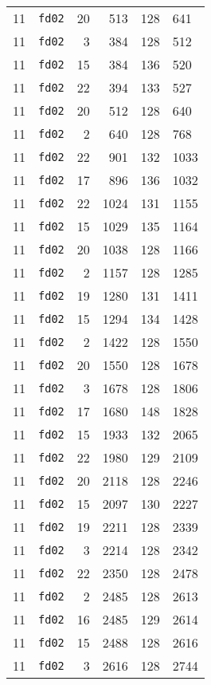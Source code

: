 \documentclass{article}
\begin{document}
\begin{table}[h!]
\begin{tabular}{llrrrl}
    11 & \texttt{fd02} & 20 & 513 & 128 & 641 \\
    11 & \texttt{fd02} & 3 & 384 & 128 & 512 \\
    11 & \texttt{fd02} & 15 & 384 & 136 & 520 \\
    11 & \texttt{fd02} & 22 & 394 & 133 & 527 \\
    11 & \texttt{fd02} & 20 & 512 & 128 & 640 \\
    11 & \texttt{fd02} & 2 & 640 & 128 & 768 \\
    11 & \texttt{fd02} & 22 & 901 & 132 & 1033 \\
    11 & \texttt{fd02} & 17 & 896 & 136 & 1032 \\
    11 & \texttt{fd02} & 22 & 1024 & 131 & 1155 \\
    11 & \texttt{fd02} & 15 & 1029 & 135 & 1164 \\
    11 & \texttt{fd02} & 20 & 1038 & 128 & 1166 \\
    11 & \texttt{fd02} & 2 & 1157 & 128 & 1285 \\
    11 & \texttt{fd02} & 19 & 1280 & 131 & 1411 \\
    11 & \texttt{fd02} & 15 & 1294 & 134 & 1428 \\
    11 & \texttt{fd02} & 2 & 1422 & 128 & 1550 \\
    11 & \texttt{fd02} & 20 & 1550 & 128 & 1678 \\
    11 & \texttt{fd02} & 3 & 1678 & 128 & 1806 \\
    11 & \texttt{fd02} & 17 & 1680 & 148 & 1828 \\
    11 & \texttt{fd02} & 15 & 1933 & 132 & 2065 \\
    11 & \texttt{fd02} & 22 & 1980 & 129 & 2109 \\
    11 & \texttt{fd02} & 20 & 2118 & 128 & 2246 \\
    11 & \texttt{fd02} & 15 & 2097 & 130 & 2227 \\
    11 & \texttt{fd02} & 19 & 2211 & 128 & 2339 \\
    11 & \texttt{fd02} & 3 & 2214 & 128 & 2342 \\
    11 & \texttt{fd02} & 22 & 2350 & 128 & 2478 \\
    11 & \texttt{fd02} & 2 & 2485 & 128 & 2613 \\
    11 & \texttt{fd02} & 16 & 2485 & 129 & 2614 \\
    11 & \texttt{fd02} & 15 & 2488 & 128 & 2616 \\
    11 & \texttt{fd02} & 3 & 2616 & 128 & 2744 \\

\end{tabular}
\end{table}
\end{document}
